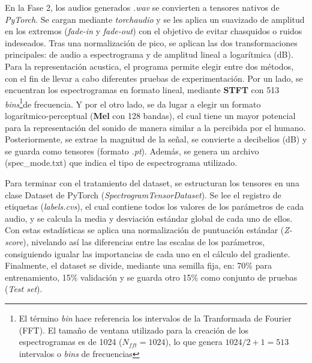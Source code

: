 \documentclass[12pt, a4paper]{article}
\begin{document}
En la Fase 2, los audios generados \textit{.wav} se convierten a tensores nativos de \textit{PyTorch}. Se cargan mediante \textit{torchaudio} y
se les aplica un suavizado de amplitud en los extremos (\textit{fade-in} y \textit{fade-out}) con el objetivo de 
evitar chasquidos o ruidos indeseados. Tras una normalización de pico, se aplican las dos transformaciones principales:
de audio a espectrograma y de amplitud lineal a logarítmica (dB). Para la representación acustica, el programa permite elegir
entre dos métodos, con el fin de llevar a cabo diferentes pruebas de experimentación. Por un lado, se encuentran 
los espectrogramas en formato lineal, mediante \textbf{STFT} con 513  \textit{bins}\footnote{El término \textit{bin} hace referencia los intervalos de la Tranformada de Fourier (FFT). 
El tamaño de ventana utilizado para la creación de los espectrogramas es de 1024 ($N_{fft} = 1024$), lo que genera
$1024 / 2 + 1 = 513$ intervalos o \textit{bins} de frecuencias}de frecuencia. Y por el otro lado, 
se da lugar a elegir un formato logarítmico-perceptual (\textbf{Mel} con 128 bandas), el cual tiene un mayor potencial para
la representación del sonido de manera similar a la percibida por el humano. Posteriormente, se extrae
la magnitud de la señal, se convierte a decibelios (dB) y se guarda como tensores (formato \textit{.pt}). Además,
se genera un archivo (spec\_mode.txt) que indica el tipo de espectrograma utilizado.

Para terminar con el tratamiento del dataset, se estructuran los tensores en una clase Dataset de PyTorch
(\textit{SpectrogramTensorDataset}). Se lee el registro de etiquetas (\textit{labels.cvs}), el cual contiene todos los
valores de los parámetros de cada audio, y se calcula la media y desviación estándar global de cada uno de ellos. Con estas estadísticas
se aplica una normalización de puntuación estándar (\textit{Z-score}), nivelando así las diferencias entre las escalas
de los parámetros, consiguiendo igualar las importancias de cada uno en el cálculo del gradiente.
Finalmente, el dataset se divide, mediante una semilla fija, en: 70\% para entrenamiento, 15\% validación y se guarda otro 15\%
como conjunto de pruebas (\textit{Test set}).
\end{document}
